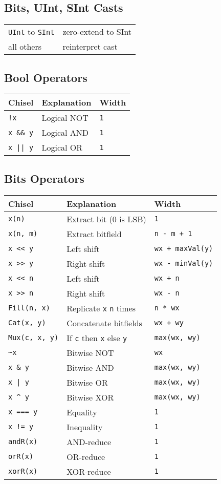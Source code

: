 \documentclass[10pt,landscape]{article}
\begin{document}
\begin{multicols}{3}
\subsection{Bits, UInt, SInt Casts}
\begin{tabular}{l l}
\verb$UInt$ to \verb$SInt$ & zero-extend to SInt \\
all others & reinterpret cast \\
\end{tabular}

\subsection{Bool Operators}
\begin{tabular}{l l l}
Chisel & Explanation & Width \\
\hline
\hline
\verb$!x$ & Logical NOT & \verb$1$ \\
\verb$x && y$ & Logical AND & \verb$1$ \\
\verb$x || y$ & Logical OR & \verb$1$ \\
\end{tabular}

\subsection{Bits Operators}
\begin{tabular}{l l l}
Chisel & Explanation & Width \\
\hline
\hline
\verb$x(n)$ & Extract bit (0 is LSB) & \verb$1$ \\
\verb$x(n, m)$ & Extract bitfield & \verb$n - m + 1$ \\
\verb$x << y$ & Left shift & \verb$wx + maxVal(y)$ \\
\verb$x >> y$ & Right shift & \verb$wx - minVal(y)$ \\
\verb$x << n$ & Left shift & \verb$wx + n$ \\
\verb$x >> n$ & Right shift & \verb$wx - n$ \\
\verb$Fill(n, x)$ & Replicate \verb$x$ \verb$n$ times & \verb$n * wx$ \\
\verb$Cat(x, y)$ & Concatenate bitfields & \verb$wx + wy$ \\
\verb$Mux(c, x, y)$ & If \verb$c$ then \verb$x$ else \verb$y$ & \verb$max(wx, wy)$ \\
\hline
\verb$~x$ & Bitwise NOT & \verb$wx$ \\
\verb$x & y$ & Bitwise AND & \verb$max(wx, wy)$ \\
\verb$x | y$ & Bitwise OR & \verb$max(wx, wy)$ \\
\verb$x ^ y$ & Bitwise XOR & \verb$max(wx, wy)$ \\
\hline
\verb$x === y$ & Equality & \verb$1$ \\
\verb$x != y$ & Inequality & \verb$1$ \\
\hline
\verb$andR(x)$ & AND-reduce & \verb$1$ \\
\verb$orR(x)$ & OR-reduce & \verb$1$ \\
\verb$xorR(x)$ & XOR-reduce & \verb$1$ \\
\end{tabular}


\end{multicols}
\end{document}
